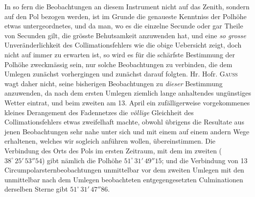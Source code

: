 \par\indent In so fern die Beobachtungen an diesem Instrument nicht auf das Zenith, sondern auf den Pol bezogen
werden, ist im Grunde die genaueste Kenntniss der Polhöhe etwas untergeordnetes, und da man, wo es
die einzelne Secunde oder gar Theile von Secunden gilt, die grösste Behutsamkeit anzuwenden hat, und
eine \textit{so grosse} Unveränderlichkeit des Collimationsfehlers wie die obige Uebersicht zeigt,
doch nicht auf immer zu erwarten ist, so wird es für die schärfste Bestimmung der Polhöhe
zweckmässig sein, nur solche Beobachtungen zu verbinden, die dem Umlegen zunächst vorhergingen und
zunächst darauf folgten. Hr. Hofr. \textsc{Gauss} wagt daher nicht, seine bisherigen Beobachtungen
zu \textit{dieser} Bestimmung anzuwenden, da nach dem ersten Umlegen ziemlich lange anhaltendes
ungünstiges Wetter eintrat, und beim zweiten am 13. April ein zufälligerweise vorgekommenes kleines
Derangement des Fadennetzes die \textit{völlige} Gleichheit des Collimationsfehlers etwas
zweifelhaft machte, obwohl übrigens die Resultate aus jenen Beobachtungen sehr nahe unter sich und
mit einem auf einem andern Wege erhaltenen, welches wir sogleich anführen wollen, übereinstimmen.
Die Verbindung des Orts des Pols im ersten Zeitraum, mit dem im zweiten ($38^\circ\,25'\,53''\!54$)
gibt nämlich die Polhöhe $51^\circ\,31'\,49''\!15$; und die Verbindung von 13
Circumpolarsternbeobachtungen unmittelbar vor dem zweiten Umlegen mit den unmittelbar nach dem
Umlegen beobachteten entgegengesetzten Culminationen derselben Sterne gibt
$51^\circ\,31'\,47''\!86$.

